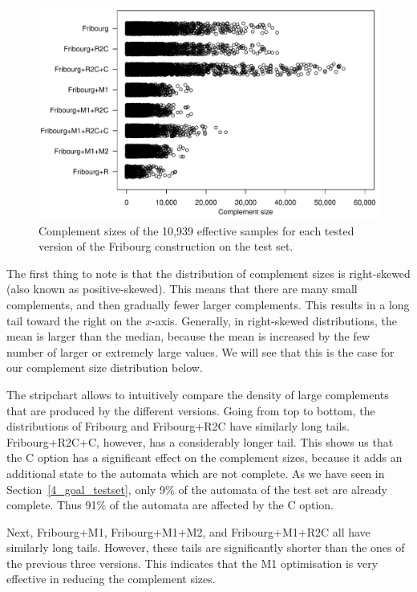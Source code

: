 \begin{figure}[ht]
\centering
\includegraphics[scale=0.575]{figures/r/internal/goal/s.stripchart.pdf}
\caption{Complement sizes of the 10,939 effective samples for each tested version of the Fribourg construction on the \goal{} test set.}
\label{i.g.stripchart}
\end{figure}

The first thing to note is that the distribution of complement sizes is right-skewed (also known as positive-skewed). This means that there are many small complements, and then gradually fewer larger complements. This results in a long tail toward the right  on the $x$-axis. Generally, in right-skewed distributions, the mean is larger than the median, because the mean is increased by the few number of larger or extremely large values. We will see that this is the case for our complement size distribution below.

The stripchart allows to intuitively compare the density of large complements that are produced by the different versions. Going from top to bottom, the distributions of Fribourg and Fribourg+R2C have similarly long tails. Fribourg+R2C+C, however, has a considerably longer tail. This shows us that the C option has a significant effect on the complement sizes, because it adds an additional state to the automata which are not complete. As we have seen in Section~\ref{4_goal_testset}, only 9\% of the automata of the \goal{} test set are already complete. Thus 91\% of the automata are affected by the C option.

Next, Fribourg+M1, Fribourg+M1+M2, and Fribourg+M1+R2C all have similarly long tails. However, these tails are significantly shorter than the ones of the previous three versions. This indicates that the M1 optimisation is very effective in reducing the complement sizes.

